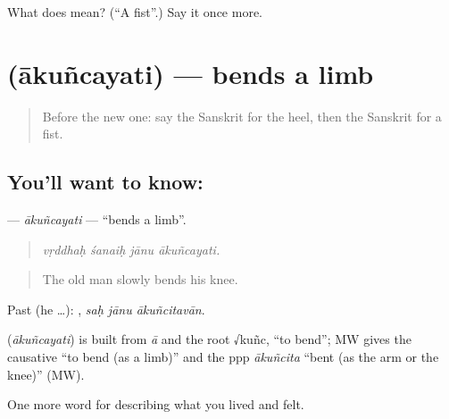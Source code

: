\begin{tcolorbox}[breakable,colback=teal!4,colframe=teal!35!black,title={Before you move on}]
What does  mean? (\textquotedblleft{}A fist\textquotedblright{}.) Say it once more.
\end{tcolorbox}
\section[\texorpdfstring{\sk{आकुञ्चयति} (ākuñcayati)}{आकुञ्चयति (ākuñcayati)}]{ (ākuñcayati) — bends a limb}

\label{lesson:SA-C473-akuncayati}



\begin{quote}
Before the new one: say the Sanskrit for the heel, then the Sanskrit for a fist.
\end{quote}

\subsection*{You'll want to know: }
\textbf{} — \emph{ākuñcayati} — \textquotedblleft{}bends a limb\textquotedblright{}.

\begin{quote}
   
\end{quote}

\begin{quote}
\emph{vṛddhaḥ śanaiḥ jānu ākuñcayati.}
\end{quote}

\begin{quote}
The old man slowly bends his knee.
\end{quote}

Past (he …):   , \emph{saḥ jānu ākuñcitavān}.

\begin{cousinweb}
\textbf{} (\emph{ākuñcayati}) is built from \emph{ā} and the root √kuñc, \textquotedblleft{}to bend\textquotedblright{}; MW gives the causative \textquotedblleft{}to bend (as a limb)\textquotedblright{} and the ppp \emph{ākuñcita} \textquotedblleft{}bent (as the arm or the knee)\textquotedblright{} (MW).
\end{cousinweb}

\begin{grammarlens}[title={What you've built}]
One more word for describing what you lived and felt.
\end{grammarlens}

